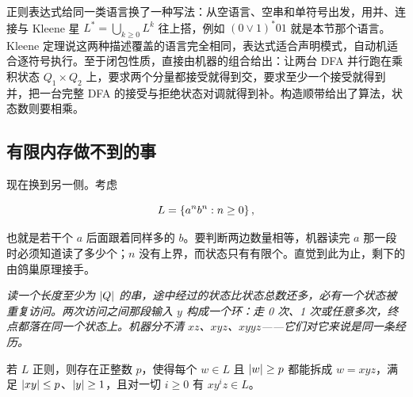 正则表达式给同一类语言换了一种写法：从空语言、空串和单符号出发，用并、连接与 Kleene 星 \(L^*=\bigcup_{k\ge0}L^k\) 往上搭，例如 \((0\lor1)^*01\) 就是本节那个语言。Kleene 定理说这两种描述覆盖的语言完全相同，表达式适合声明模式，自动机适合逐符号执行。至于闭包性质，直接由机器的组合给出：让两台 DFA 并行跑在乘积状态 \(Q_1\times Q_2\) 上，要求两个分量都接受就得到交，要求至少一个接受就得到并，把一台完整 DFA 的接受与拒绝状态对调就得到补。构造顺带给出了算法，状态数则要相乘。

\subsection{有限内存做不到的事}

现在换到另一侧。考虑

\[
L=\left\{a^nb^n:n\ge0\right\},
\]

也就是若干个 \(a\) 后面跟着同样多的 \(b\)。要判断两边数量相等，机器读完 \(a\) 那一段时必须知道读了多少个；\(n\) 没有上界，而状态只有有限个。直觉到此为止，剩下的由鸽巢原理接手。

\begin{center}

\emph{读一个长度至少为 \(\left|Q\right|\) 的串，途中经过的状态比状态总数还多，必有一个状态被重复访问。两次访问之间那段输入 \(y\) 构成一个环：走 0 次、1 次或任意多次，终点都落在同一个状态上。机器分不清 \(xz\)、\(xyz\)、\(xyyz\)——它们对它来说是同一条经历。}
\end{center}

\begin{lemma}[泵引理]
若 \(L\) 正则，则存在正整数 \(p\)，使得每个 \(w\in L\) 且 \(\left|w\right|\ge p\) 都能拆成 \(w=xyz\)，满足 \(\left|xy\right|\le p\)、\(\left|y\right|\ge1\)，且对一切 \(i\ge0\) 有 \(xy^iz\in L\)。
\end{lemma}

